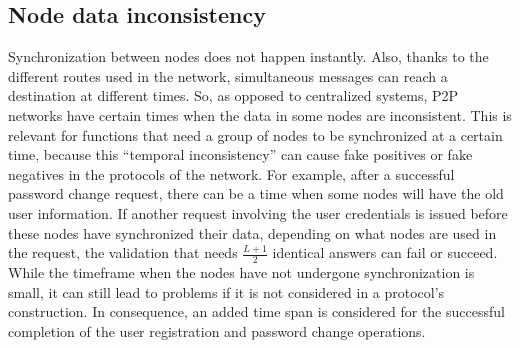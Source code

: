 


%
%

\subsection{Node data inconsistency}
Synchronization between nodes does not happen instantly. Also, thanks to
the different routes used in the network, simultaneous messages can reach a
destination at different times. So, as opposed to centralized systems, P2P
networks have certain times when the data in some nodes are inconsistent.
This is relevant for functions that need a
group of nodes to be synchronized at a certain time, because this ``temporal
inconsistency''  can cause fake positives or fake negatives in the protocols of
the network. For example, after a successful password change request, there can
be a time when some nodes will have the old user information. If another
request involving the user credentials is issued before these nodes have
synchronized their data, depending on what nodes are used in the request, the
validation that needs $\frac{L+1}{2}$ identical answers can fail or succeed.
While the timeframe when the nodes have not undergone synchronization is small,
it can still lead to problems if it is not considered in a protocol's
construction. In consequence, an added time span is considered for the
successful completion of the user registration and password change operations.



